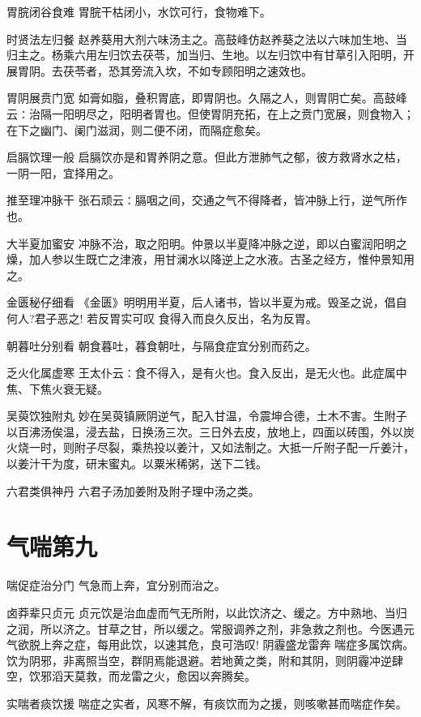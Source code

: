 \documentclass[a4paper,12pt,UTF8,twoside]{ctexbook}
\begin{document}
    胃脘闭谷食难
    胃脘干枯闭小，水饮可行，食物难下。
    
    时贤法左归餐
    赵养葵用大剂六味汤主之。高鼓峰仿赵养葵之法以六味加生地、当归主之。杨乘六用左归饮去茯苓，加当归、生地。以左归饮中有甘草引入阳明，开展胃阴。去茯苓者，恐其旁流入坎，不如专顾阳明之速效也。
    
    胃阴展贲门宽
    如膏如脂，叠积胃底，即胃阴也。久隔之人，则胃阴亡矣。高鼓峰云∶治隔一阳明尽之，阳明者胃也。但使胃阴充拓，在上之贲门宽展，则食物入；在下之幽门、阑门滋润，则二便不闭，而隔症愈矣。
    
    启膈饮理一般
    启膈饮亦是和胃养阴之意。但此方泄肺气之郁，彼方救肾水之枯，一阴一阳，宜择用之。
    
    推至理冲脉干
    张石顽云∶膈咽之间，交通之气不得降者，皆冲脉上行，逆气所作也。
    
    大半夏加蜜安
    冲脉不治，取之阳明。仲景以半夏降冲脉之逆，即以白蜜润阳明之燥，加人参以生既亡之津液，用甘澜水以降逆上之水液。古圣之经方，惟仲景知用之。
    
    金匮秘仔细看
    《金匮》明明用半夏，后人诸书，皆以半夏为戒。毁圣之说，倡自何人?君子恶之!
    若反胃实可叹
    食得入而良久反出，名为反胃。
    
    朝暮吐分别看
    朝食暮吐，暮食朝吐，与隔食症宜分别而药之。
    
    乏火化属虚寒
    王太仆云∶食不得入，是有火也。食入反出，是无火也。此症属中焦、下焦火衰无疑。
    
    吴萸饮独附丸
    妙在吴萸镇厥阴逆气，配入甘温，令震坤合德，土木不害。生附子以百沸汤俟温，浸去盐，日换汤三次。三日外去皮，放地上，四面以砖围，外以炭火烧一时，则附子尽裂，乘热投以姜汁，又如法制之。大抵一斤附子配一斤姜汁，以姜汁干为度，研末蜜丸。以粟米稀粥，送下二钱。
    
    六君类俱神丹
    六君子汤加姜附及附子理中汤之类。
    
  \chapter{气喘第九}
    喘促症治分门
    气急而上奔，宜分别而治之。
    
    卤莽辈只贞元
    贞元饮是治血虚而气无所附，以此饮济之、缓之。方中熟地、当归之润，所以济之。甘草之甘，所以缓之。常服调养之剂，非急救之剂也。今医遇元气欲脱上奔之症，每用此饮，以速其危，良可浩叹!
    阴霾盛龙雷奔
    喘症多属饮病。饮为阴邪，非离照当空，群阴焉能退避。若地黄之类，附和其阴，则阴霾冲逆肆空，饮邪滔天莫救，而龙雷之火，愈因以奔腾矣。
    
    实喘者痰饮援
    喘症之实者，风寒不解，有痰饮而为之援，则咳嗽甚而喘症作矣。
    
\end{document}
